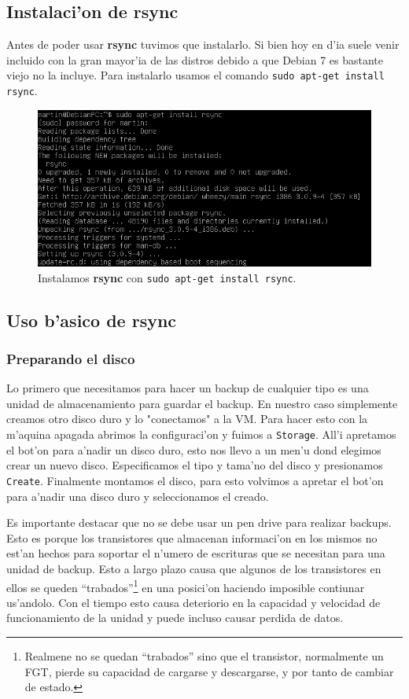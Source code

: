 \documentclass[11pt]{article}
\newcommand{\rsync}[0]{\textbf{rsync }}
\begin{document}
	\subsection{Instalaci'on de rsync}
		Antes de poder usar \rsync tuvimos que instalarlo. Si bien hoy en d'ia suele venir incluido con la gran mayor'ia de las distros debido a que Debian 7 es bastante viejo no la incluye. Para instalarlo usamos el comando \texttt{sudo apt-get install rsync}.

		\begin{figure}[H]
    			\centering
    			\includegraphics[scale=0.7]{Images/rsync/rsync_install.PNG}
    			\caption{Instalamos \textbf{rsync} con \texttt{sudo apt-get install rsync}.}
    			\label{fig:rsync_install}
		\end{figure}

	\subsection{Uso b'asico de rsync}
	\subsubsection{Preparando el disco}
		Lo primero que necesitamos para hacer un backup de cualquier tipo es una unidad de almacenamiento para guardar el backup. En nuestro caso simplemente creamos otro disco duro y lo "conectamos" a la VM. Para hacer esto con la m'aquina apagada abrimos la configuraci'on y fuimos a \texttt{Storage}. All'i apretamos el bot'on para a'nadir un disco duro, esto nos llevo a un men'u  dond elegimos crear un nuevo disco. Especificamos el tipo y tama'no del disco y presionamos \texttt{Create}. Finalmente montamos el disco, para esto volvimos a apretar el bot'on para a'nadir una disco duro y seleccionamos el creado.

		Es importante destacar que no se debe usar un pen drive para realizar backups. Esto es porque los transistores que almacenan informaci'on en los mismos no est'an hechos para soportar el n'umero de escrituras que se necesitan para una unidad de backup. Esto a largo plazo causa que algunos de los transistores en ellos se queden ``trabados''\footnote{Realmene no se quedan ``trabados'' sino que el transistor, normalmente un FGT, pierde su capacidad de cargarse y descargarse, y por tanto de cambiar de estado.} en una posici'on haciendo imposible contiunar us'andolo. Con el tiempo esto causa deteriorio en la capacidad y velocidad de funcionamiento de la unidad y puede incluso causar perdida de datos.
\end{document}
